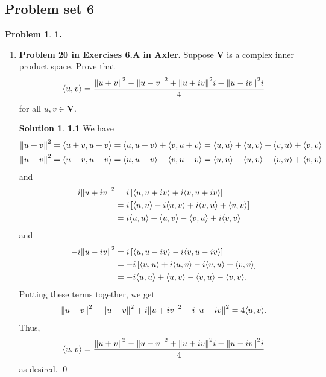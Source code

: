 \documentclass{article}
\theoremstyle{definition}
\newtheorem*{prob*}{Problem}
\newtheorem*{sln*}{Solution}
\newcommand{\V}{\mathbf{V}}
\newcommand{\la}{\langle}
\newcommand{\ra}{\rangle}
\begin{document}
\newpage


\subsection{Problem set 6}


\begin{prob*}\textbf{1.} \\
	\begin{enumerate}
		\item \textbf{Problem 20 in Exercises 6.A in Axler.} Suppose $\V$ is a complex inner product space. Prove that
		\begin{align*}
		\la u ,v \ra = \frac{\norm{u+ v}^2  - \norm{u-v}^2 + \norm{u + iv}^2i - \norm{u - iv}^2i   }{4} 
		\end{align*}
		for all $u,v \in \V$.
		
		\begin{sln*}\textbf{1.1} 
			We have
			\begin{align*}
			&\norm{u+v}^2 = \la u+v, u+v \ra = \la u,u+v \ra + \la v,u+v \ra = \la u,u\ra + \la u,v \ra + \la v,u \ra + \la v,v \ra\\
			&\norm{u-v}^2 = \la u-v, u-v \ra = \la u,u-v \ra - \la v,u-v \ra = \la u,u\ra - \la u,v \ra - \la v,u \ra + \la v,v \ra
			\end{align*}
			and
			\begin{align*}
			i\norm{u+iv}^2 &= i \left[ \la u,u+iv \ra + i\la v,u+iv\ra \right]\\
			&= i \left[ \la u,u \ra -i\la u,v \ra + i\la v,u\ra + \la v,v \ra \right]\\
			&= i\la u,u \ra + \la u,v \ra - \la v,u\ra + i\la v,v\ra
			\end{align*}
			and
			\begin{align*}
			-i\norm{u-iv}^2 &= i \left[ \la u,u-iv \ra - i\la v,u-iv\ra \right]\\
			&= -i \left[ \la u,u \ra +i\la u,v \ra - i\la v,u\ra + \la v,v \ra \right]\\
			&= -i\la u,u \ra + \la u,v \ra - \la v,u\ra - \la v,v\ra.
			\end{align*}
			Putting these terms together, we get
			\begin{align*}
			\norm{u+v}^2  -\norm{u-v}^2 + i\norm{u+iv}^2 -i\norm{u-iv}^2 = 4\la u,v \ra.
			\end{align*}
			Thus, 
			\begin{align*}
			\la u ,v \ra = \frac{\norm{u+ v}^2  - \norm{u-v}^2 + \norm{u + iv}^2i - \norm{u - iv}^2i   }{4}
			\end{align*}
			as desired. \qed
		\end{sln*}
		

\end{enumerate}
\end{prob*}
\end{document}
